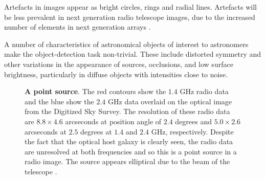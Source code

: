 Artefacts in images appear as bright circles, rings and radial lines. Artefacts will be less prevalent in next generation radio telescope images, due to the increased number of elements in next generation arrays \cite{norris2011emu}. 

A number of characteristics of astronomical objects of interest to astronomers make the object-detection task non-trivial. These include distorted symmetry and other variations in the appearance of sources, occlusions, and low surface brightness, particularly in diffuse objects with intensities close to noise.

\begin{figure}
\centering
{}
\caption[Point source]{\textbf{A point source}. The red contours show the $1.4$ GHz radio data and the blue show the $2.4$ GHz data overlaid on the optical image from the Digitized Sky Survey. The resolution of these radio data are $8.8 \times 4.6$ arcseconds at position angle of $2.4$ degrees and $5.0 \times 2.6$ arcseconds at $2.5$ degrees at $1.4$ and $2.4$ GHz, respectively. Despite the fact that the optical host galaxy is clearly seen, the radio data are unresolved at both frequencies and so this is a point source in a radio image. The source appears elliptical due to the beam of the telescope \cite{johnston2008radio}.}
\label{fig:pointsource}
\end{figure}

